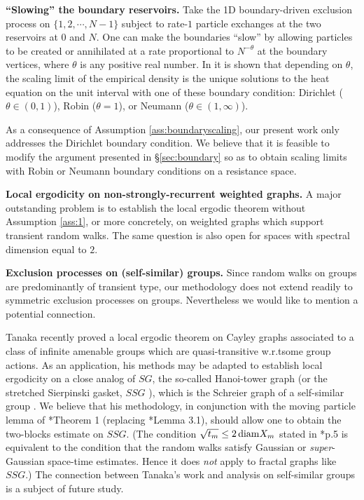 \documentclass[11pt]{amsart}
\theoremstyle{plain}
\theoremstyle{definition}
\theoremstyle{remark}
\begin{document}
\textbf{``Slowing'' the boundary reservoirs.} Take the 1D boundary-driven exclusion process on $\{1,2,\cdots, N-1\}$ subject to rate-$1$ particle exchanges at the two reservoirs at $0$ and $N$. One can make the boundaries ``slow'' by allowing particles to be created or annihilated at a rate proportional to $N^{-\theta}$ at the boundary vertices, where $\theta$ is any positive real number. In \cite{BMNS} it is shown that depending on $\theta$, the scaling limit of the empirical density is the unique solutions to the heat equation on the unit interval with one of these boundary condition: Dirichlet ($\theta\in (0,1)$), Robin ($\theta =1$), or Neumann ($\theta \in (1,\infty)$). 

As a consequence of Assumption \ref{ass:boundaryscaling}, our present work only addresses the Dirichlet boundary condition. We believe that it is feasible to modify the argument presented in \S\ref{sec:boundary} so as to obtain scaling limits with Robin or Neumann boundary conditions on a resistance space.


\textbf{Local ergodicity on non-strongly-recurrent weighted graphs.} A major outstanding problem is to establish the local ergodic theorem without Assumption \ref{ass:1}, or more concretely, on weighted graphs which support transient random walks. The same question is also open for spaces with spectral dimension equal to $2$. 


\textbf{Exclusion processes on (self-similar) groups.}
Since random walks on groups \cite{Woess} are predominantly of transient type, our methodology does not extend readily to symmetric exclusion processes on groups. Nevertheless we would like to mention a potential connection.

Tanaka \cite{Tanaka} recently proved a local ergodic theorem on Cayley graphs associated to a class of infinite amenable groups which are quasi-transitive w.r.t\@ some group actions. As an application, his methods may be adapted to establish local ergodicity on a close analog of $SG$, the so-called Hanoi-tower graph (or the stretched Sierpinski gasket, $SSG$ \cite{AFK16}), which is the Schreier graph of a self-similar group \cite{NekBook}. We believe that his methodology, in conjunction with the moving particle lemma of \cite{ChenMPL}*{Theorem 1} (replacing \cite{Tanaka}*{Lemma 3.1}), should allow one to obtain the two-blocks estimate on $SSG$. (The condition $\sqrt{t_m} \leq 2\,{\rm diam}X_m$ stated in \cite{Tanaka}*{p.\@ 5} is equivalent to the condition that the random walks satisfy Gaussian or \emph{super}-Gaussian space-time estimates. Hence it does \emph{not} apply to fractal graphs like $SSG$.) The connection between Tanaka's work and analysis on self-similar groups \cite{NekTep} is a subject of future study.
\end{document}
